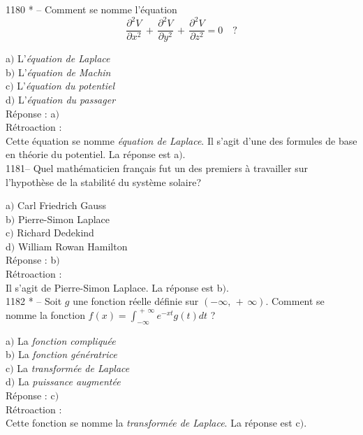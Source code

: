 ﻿\documentclass[letterpaper, 12pt]{article}
\begin{document}
1180 * -- Comment se nomme l'\'equation
$$\displaystyle{\frac{\partial^2V}{\partial
x^2}\,+\,\frac{\partial^2V}{\partial y^2}\,+\,\frac{\partial^2V}{\partial
z^2}=0}\quad?$$

a$)$ L'{\sl \'equation de Laplace} \\
b$)$ L'{\sl \'equation de Machin} \\
c$)$ L'{\sl \'equation du potentiel} \\
d$)$ L'{\sl \'equation du passager}\\


R\'eponse : a$)$\\

R\'etroaction : \\
Cette \'equation se nomme {\sl \'equation de Laplace}. Il s'agit
d'une des formules de base en th\'eorie du potentiel.
La r\'eponse est a$)$.\\

1181-- Quel math\'ematicien fran\c cais fut un des premiers \`a
travailler sur l'hypoth\`ese de la stabilit\'e du syst\`eme solaire?

a$)$ Carl Friedrich Gauss \\
b$)$ Pierre-Simon Laplace \\
c$)$ Richard Dedekind \\
d$)$ William Rowan Hamilton\\

R\'eponse : b$)$\\

R\'etroaction : \\
Il s'agit de Pierre-Simon Laplace.
La r\'eponse est b$)$.\\

1182 * -- Soit $g$ une fonction r\'eelle d\'efinie sur
$(-\infty,\,+\,\infty)$. Comment se nomme la fonction
$f(x)=\int_{-\infty}^{\,+\,\infty}e^{-xt}g(t)dt$ ?

a$)$ La {\sl fonction compliqu\'ee} \\
b$)$ La {\sl fonction g\'en\'eratrice} \\
c$)$ La {\sl transform\'ee de Laplace} \\
d$)$ La {\sl puissance augment\'ee}\\

R\'eponse : c$)$\\

R\'etroaction : \\
Cette fonction se nomme la {\sl transform\'ee de Laplace}.
La r\'eponse est c$)$.\\
\end{document}
